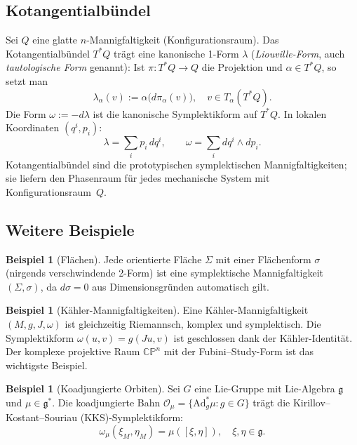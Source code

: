 \documentclass[12pt,a4paper]{amsart}
\theoremstyle{definition}
\newtheorem{beispiel}[theorem]{Beispiel}
\begin{document}
\subsection{Kotangentialbündel}

Sei $Q$ eine glatte $n$-Mannigfaltigkeit (Konfigurationsraum).  Das
Kotangentialbündel $T^*Q$ trägt eine kanonische 1-Form $\lambda$ (\emph{Liouville-Form},
auch \emph{tautologische Form} genannt): Ist $\pi: T^*Q \to Q$ die Projektion
und $\alpha \in T^*Q$, so setzt man
\[
  \lambda_\alpha(v) := \alpha\bigl(d\pi_\alpha(v)\bigr), \quad v \in T_\alpha(T^*Q).
\]
Die Form $\omega := -d\lambda$ ist die kanonische Symplektikform auf $T^*Q$.
In lokalen Koordinaten $(q^i, p_i)$:
\[
  \lambda = \sum_i p_i \, dq^i, \qquad \omega = \sum_i dq^i \wedge dp_i.
\]
Kotangentialbündel sind die prototypischen symplektischen Mannigfaltigkeiten;
sie liefern den Phasenraum für jedes mechanische System mit Konfigurationsraum~$Q$.

\subsection{Weitere Beispiele}

\begin{beispiel}[Flächen]
Jede orientierte Fläche $\Sigma$ mit einer Flächenform $\sigma$ (nirgends
verschwindende 2-Form) ist eine symplektische Mannigfaltigkeit $(\Sigma,
\sigma)$, da $d\sigma = 0$ aus Dimensionsgründen automatisch gilt.
\end{beispiel}

\begin{beispiel}[Kähler-Mannigfaltigkeiten]
Eine Kähler-Mannigfaltigkeit $(M, g, J, \omega)$ ist gleichzeitig Riemannsch,
komplex und symplektisch.  Die Symplektikform $\omega(u,v) = g(Ju, v)$ ist
geschlossen dank der Kähler-Identität.  Der komplexe projektive Raum
$\mathbb{CP}^n$ mit der Fubini--Study-Form ist das wichtigste Beispiel.
\end{beispiel}

\begin{beispiel}[Koadjungierte Orbiten]
Sei $G$ eine Lie-Gruppe mit Lie-Algebra $\mathfrak{g}$ und $\mu \in
\mathfrak{g}^*$.  Die koadjungierte Bahn $\mathcal{O}_\mu = \{\mathrm{Ad}^*_g
\mu : g \in G\}$ trägt die Kirillov--Kostant--Souriau (KKS)-Symplektikform:
\[
  \omega_\mu(\xi_M, \eta_M) = \mu([\xi, \eta]), \quad \xi, \eta \in \mathfrak{g}.
\]
\end{beispiel}

\end{document}
